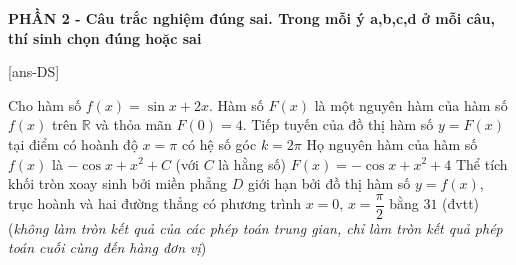 

\begin{center}
	\textbf{PHẦN 2 - Câu trắc nghiệm đúng sai. Trong mỗi ý a,b,c,d ở mỗi câu, thí sinh chọn đúng hoặc sai}
\end{center}
\setcounter{ex}{0}
[ans-DS]
\begin{ex}%
	Cho hàm số $f(x)= \sin x +2x$. Hàm số $F(x)$ là một nguyên hàm của hàm số $f(x)$ trên $\mathbb{R}$ và thỏa mãn $F(0)=4$.
	\choiceTF
	{\True Tiếp tuyến của đồ thị hàm số $y=F(x)$ tại điểm có hoành độ $x = \pi$ có hệ số góc $k=2\pi$}
	{\True Họ nguyên hàm của hàm số $f(x)$ là $-\cos x+x^2+C$ (với $C$ là hằng số)}
	{$F(x)= -\cos x+x^2+4$}
	{\True Thể tích khối tròn xoay sinh bởi miền phẳng $D$ giới hạn bởi đồ thị hàm số $y=f(x)$, trục hoành và hai đường thẳng có phương trình $x=0$, $x= \dfrac{\pi}{2}$ bằng $31$ (đvtt) (\textit{không làm tròn kết quả của các phép toán trung gian, chỉ làm tròn kết quả phép toán cuối cùng đến hàng đơn vị})}
\end{ex}
